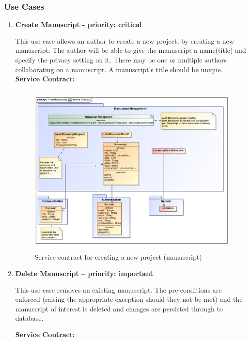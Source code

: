 \subsubsection{Use Cases}
\begin{enumerate}
\item \textbf{Create Manuscript - priority: critical}

\par{This use case allows an author to create a new project, by creating a new manuscript. The author will be able to give the manuscript a name(title) and specify the privacy setting on it. There may be one or multiple authors collaborating on a manuscript.
A manuscript's title should be unique.}\\

\textbf{Service Contract:}

\begin{figure}[h]
\includegraphics[height=330px, width=500px]{epsImages/ManuscriptManagement/createManuscriptServiceContract.eps}
\caption{Service contract for creating a new project (manuscript)}
\end{figure}

\newpage
\item \textbf{Delete Manuscript – priority: important}
\par{This use case removes an existing manuscript. The pre-conditions are enforced (raising the appropriate exception should they not be met) and the manuscript of interest is deleted and changes are persisted through to database.}

\textbf{Service Contract:} 



\end{enumerate}
